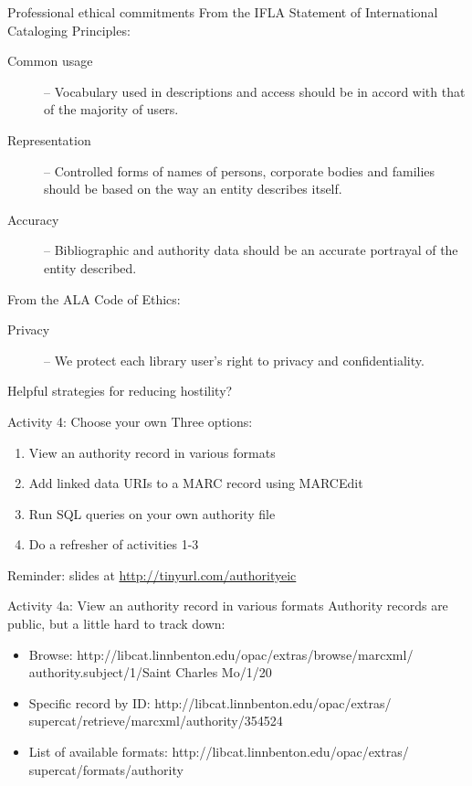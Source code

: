 \documentclass{beamer}
\begin{document}
\begin{frame}{Professional ethical commitments}
From the IFLA Statement of International Cataloging Principles:
 \begin{description}
  \item[Common usage] -- Vocabulary used in descriptions and access should be in accord with that 
of the majority of users. 
  \item[Representation] --  Controlled forms 
of  names  of  persons, 
corporate 
bodies  and  families  should  be  based  on  the  way  an  entity 
describes itself.
  \item[Accuracy] -- Bibliographic and authority data should be an accurate portrayal of 
the entity 
described.
 \end{description}
 
 From the ALA Code of Ethics:
 \begin{description}
  \item[Privacy] -- We protect each library user's right to privacy and confidentiality.
 \end{description}
 
 
\end{frame}

\begin{frame}{Helpful strategies for reducing hostility?}
\end{frame}




\begin{frame}{Activity 4: Choose your own}
Three options:
\begin{enumerate}
 \item View an authority record in various formats
 \item Add linked data URIs to a MARC record using MARCEdit
 \item Run SQL queries on your own authority file
 \item Do a refresher of activities 1-3
\end{enumerate}
Reminder: slides at \url{http://tinyurl.com/authorityeic}


\end{frame}

\begin{frame}{Activity 4a: View an authority record in various formats}
 Authority records are public, but a little hard to track down:
 \begin{itemize}
  \item Browse: http://libcat.linnbenton.edu/opac/extras/browse/marcxml/ authority.subject/1/Saint Charles Mo/1/20
  \item Specific record by ID: http://libcat.linnbenton.edu/opac/extras/ supercat/retrieve/marcxml/authority/354524
  \item List of available formats: http://libcat.linnbenton.edu/opac/extras/ supercat/formats/authority
 \end{itemize}

\end{frame}
\end{document}

